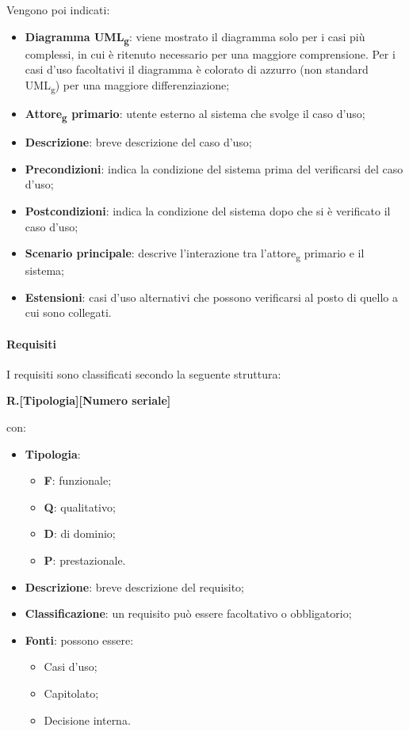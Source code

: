 \noindent Vengono poi indicati:
    \begin{itemize}
        \item \textbf{Diagramma UML\textsubscript{g}}: viene mostrato il diagramma solo per i casi più complessi, in cui è ritenuto necessario per una maggiore comprensione. Per i casi d’uso facoltativi il diagramma è colorato di azzurro (non standard UML\textsubscript{g}) per una maggiore differenziazione;
	    \item \textbf{Attore\textsubscript{g} primario}: utente esterno al sistema che svolge il caso d’uso;
	    \item \textbf{Descrizione}: breve descrizione del caso d’uso;
	    \item \textbf{Precondizioni}: indica la condizione del sistema prima del verificarsi del caso d’uso;
	    \item \textbf{Postcondizioni}: indica la condizione del sistema dopo che si è verificato il caso d’uso;
	    \item \textbf{Scenario principale}: descrive l’interazione tra l’attore\textsubscript{g} primario e il sistema;
	    \item \textbf{Estensioni}: casi d’uso alternativi che possono verificarsi al posto di quello a cui sono collegati. 
    \end{itemize}

\paragraph{Requisiti} 
I requisiti sono classificati secondo la seguente struttura: 

\begin{center}\textbf{R.[Tipologia][Numero seriale]}\end{center}

\noindent con:
    \begin{itemize}
        \item \textbf{Tipologia}: 
            \begin{itemize}
                \item \textbf{F}: funzionale;
                \item \textbf{Q}: qualitativo;
                \item \textbf{D}: di dominio;
                \item \textbf{P}: prestazionale.
            \end{itemize}
	    \item \textbf{Descrizione}: breve descrizione del requisito;
	    \item \textbf{Classificazione}: un requisito può essere facoltativo o obbligatorio;
	    \item \textbf{Fonti}: possono essere: 
            \begin{itemize}
                \item Casi d’uso;
                \item Capitolato;
                \item Decisione interna.
            \end{itemize}
    \end{itemize}


